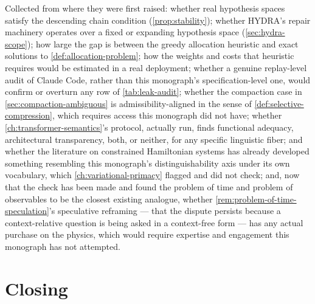 \documentclass[11pt]{book}
\theoremstyle{plain}
\theoremstyle{definition}
\theoremstyle{remark}
\begin{document}
Collected from where they were first raised: whether real hypothesis
spaces satisfy the descending chain condition
(\cref{prop:stability}); whether HYDRA's repair machinery operates
over a fixed or expanding hypothesis space
(\cref{sec:hydra-scope}); how large the gap is between the greedy
allocation heuristic and exact solutions to
\cref{def:allocation-problem}; how the weights and costs that
heuristic requires would be estimated in a real deployment; whether a
genuine replay-level audit of Claude Code, rather than this
monograph's specification-level one, would confirm or overturn any
row of \cref{tab:leak-audit}; whether the compaction case in
\cref{sec:compaction-ambiguous} is admissibility-aligned in the sense
of \cref{def:selective-compression}, which requires access this
monograph did not have; whether \cref{ch:transformer-semantics}'s
protocol, actually run, finds functional adequacy, architectural
transparency, both, or neither, for any specific linguistic fiber; and
whether the literature on constrained Hamiltonian systems has already
developed something resembling this monograph's distinguishability
axis under its own vocabulary, which \cref{ch:variational-primacy}
flagged and did not check; and, now that the check has been made and
found the problem of time and problem of observables to be the closest
existing analogue, whether \cref{rem:problem-of-time-speculation}'s
speculative reframing --- that the dispute persists because a
context-relative question is being asked in a context-free form --- has
any actual purchase on the physics, which would require expertise and
engagement this monograph has not attempted.

\section{Closing}
\end{document}
